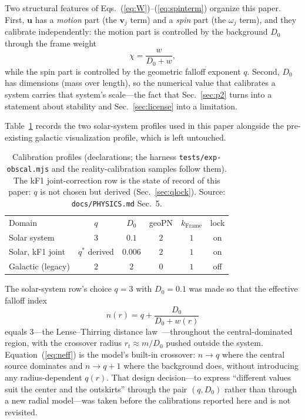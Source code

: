 \documentclass[aps,reprint,amsmath,amssymb,nofootinbib,superscriptaddress,floatfix]{revtex4-2}
\begin{document}
Two structural features of Eqs.~(\ref{eq:W})--(\ref{eq:spinterm})
organize this paper.
First, $\bm u$ has a \emph{motion} part (the $\bm v_j$ term) and a
\emph{spin} part (the $\omega_j$ term), and they calibrate
independently: the motion part is controlled by the background $D_0$
through the frame weight
\begin{equation}
  \chi = \frac{w}{D_0+w},
  \label{eq:chi}
\end{equation}
while the spin part is controlled by the geometric falloff exponent
$q$.
Second, $D_0$ has dimensions (mass over length), so the numerical value
that calibrates a system carries that system's scale---the fact that
Sec.~\ref{sec:p2} turns into a statement about stability and
Sec.~\ref{sec:license} into a limitation.

Table~\ref{tab:profiles} records the two solar-system profiles used in
this paper alongside the pre-existing galactic visualization profile,
which is left untouched.

\begin{table}[t]
\caption{Calibration profiles (declarations; the harness
  \texttt{tests/exp-obscal.mjs} and the reality-calibration samples
  follow them). The kF1 joint-correction row is the state of record of
  this paper: $q$ is not chosen but derived
  (Sec.~\ref{sec:qlock}). Source: \texttt{docs/PHYSICS.md} Sec.~5.}
\label{tab:profiles}
\begin{ruledtabular}
\begin{tabular}{lccccc}
Domain & $q$ & $D_0$ & geoPN & $k_{\mathrm{Frame}}$ & lock \\
\colrule
Solar system & $3$ & $0.1$ & $2$ & $1$ & on \\
Solar, kF1 joint & $q^{*}$ derived & $0.006$ & $2$ & $1$ & on \\
Galactic (legacy) & $2$ & $2$ & $0$ & $1$ & off \\
\end{tabular}
\end{ruledtabular}
\end{table}

The solar-system row's choice $q=3$ with $D_0=0.1$ was made so that
the effective falloff index
\begin{equation}
  n(r) = q+\frac{D_0}{D_0+w(r)}
  \label{eq:neff}
\end{equation}
equals $3$---the Lense--Thirring distance
law~\cite{LenseThirring1918}---throughout the
central-dominated region, with the crossover radius $r_t\approx m/D_0$
pushed outside the system.
Equation~(\ref{eq:neff}) is the model's built-in crossover: $n\to q$
where the central source dominates and $n\to q+1$ where the background
does, without introducing any radius-dependent $q(r)$.
That design decision---to express ``different values suit the center and
the outskirts'' through the pair $(q,D_0)$ rather than through a new
radial model---was taken before the calibrations reported here and is
not revisited.
\end{document}
